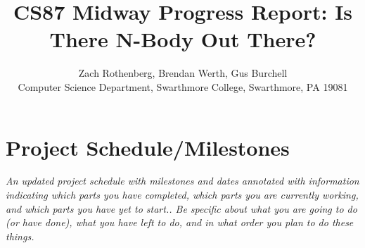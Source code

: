 \documentclass[11pt]{article}
\begin{document}
\title{CS87 Midway Progress Report: Is There N-Body Out There?}

\author{Zach Rothenberg, Brendan Werth, Gus Burchell \\
Computer Science Department, Swarthmore College, Swarthmore, PA  19081}

\maketitle

\section{Project Schedule/Milestones}

{\it
An updated project schedule with milestones and dates annotated with
information indicating which parts you have completed, which parts you are
currently working, and which parts you have yet to start.. Be specific about
what you are going to do (or have done), what you have left to do, and in what
order you plan to do these things.}
\end{document}
